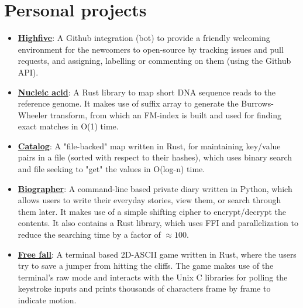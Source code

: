 \documentclass[11pt,a4paper,sans]{moderncv}        %
\newcommand\chref[3][linky]{\href{#2}{\color{#1}#3}}
\begin{document}
\newpage

\section{Personal projects}
\begin{itemize}
\item \textbf{\chref{https://github.com/servo-automation/highfive}{Highfive}}: A Github integration (bot) to provide a friendly welcoming environment for the newcomers to open-source by tracking issues and pull requests, and assigning, labelling or commenting on them (using the Github API).
\item \textbf{\chref{https://github.com/wafflespeanut/nucleic-acid}{Nucleic acid}}: A Rust library to map short DNA sequence reads to the reference genome. It makes use of suffix array to generate the Burrows-Wheeler transform, from which an FM-index is built and used for finding exact matches in O(1) time.
\item \textbf{\chref{https://github.com/wafflespeanut/rust-catalog}{Catalog}}: A "file-backed" map written in Rust, for maintaining key/value pairs in a file (sorted with respect to their hashes), which uses binary search and file seeking to "get" the values in O(log-n) time.
\item \textbf{\chref{https://github.com/wafflespeanut/biographer}{Biographer}}: A command-line based private diary written in Python, which allows users to write their everyday stories, view them, or search through them later. It makes use of a simple shifting cipher to encrypt/decrypt the contents. It also contains a Rust library, which uses FFI and parallelization to reduce the searching time by a factor of $\approx 100$.
\item \textbf{\chref{https://github.com/wafflespeanut/free-fall}{Free fall}}: A terminal based 2D-ASCII game written in Rust, where the users try to save a jumper from hitting the cliffs. The game makes use of the terminal's raw mode and interacts with the Unix C libraries for polling the keystroke inputs and prints thousands of characters frame by frame to indicate motion.
\end{itemize}


\end{document}
